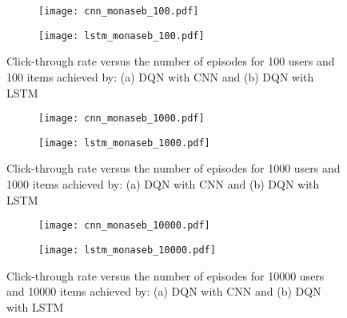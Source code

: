 \documentclass[journal]{IEEEtran}
\begin{document}
\begin{figure}[!ht]
\centering
\begin{subfigure}[b]{0.45\textwidth}
\texttt{[image: cnn\_monaseb\_100.pdf]}
\caption{}
\label{cnn100}
\end{subfigure}
\quad
\begin{subfigure}[b]{0.45\textwidth}
\texttt{[image: lstm\_monaseb\_100.pdf]}
\caption{}
\label{lstm100}
\end{subfigure}
\caption{Click-through rate versus the number of  episodes for 100 users and 100 items achieved by: (a) DQN with CNN and (b) DQN with LSTM}\label{cnn_lstm_1}
\end{figure}

%

\begin{figure}[!ht]
\centering
\begin{subfigure}[b]{0.45\textwidth}
\texttt{[image: cnn\_monaseb\_1000.pdf]}
\caption{}
\label{cnn1000}
\end{subfigure}
\quad
\begin{subfigure}[b]{0.45\textwidth}
\texttt{[image: lstm\_monaseb\_1000.pdf]}
\caption{}
\label{lstm1000}
\end{subfigure}
\caption{Click-through rate versus the number of  episodes for 1000 users and 1000 items achieved by: (a) DQN with CNN and (b) DQN with LSTM}\label{cnn_lstm_2}
\end{figure}

%


\begin{figure}[!ht]
\centering
\begin{subfigure}[b]{0.45\textwidth}
\texttt{[image: cnn\_monaseb\_10000.pdf]}
\caption{}
\label{cnn10000}
\end{subfigure}
\quad
\begin{subfigure}[b]{0.45\textwidth}
\texttt{[image: lstm\_monaseb\_10000.pdf]}
\caption{}
\label{lstm10000}
\end{subfigure}
\caption{Click-through rate versus the number of  episodes for 10000 users and 10000 items achieved by: (a) DQN with CNN and (b) DQN with LSTM}\label{cnn_lstm_3}
\end{figure}
\end{document}
